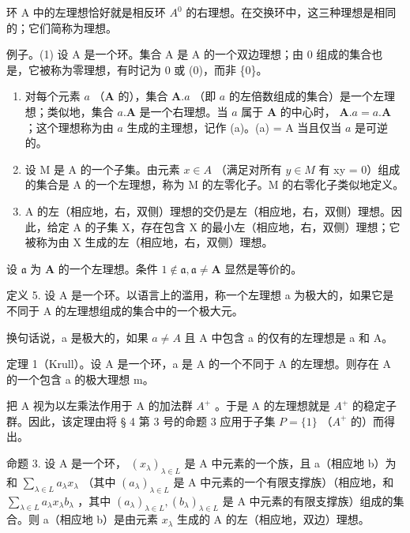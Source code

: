 环 A 中的左理想恰好就是相反环 \(A^{0}\) 的右理想。在交换环中，这三种理想是相同的；它们简称为理想。

例子。(1) 设 A 是一个环。集合 A 是 A 的一个双边理想；由 0 组成的集合也是，它被称为零理想，有时记为 0 或 (0)，而非 \{0\}。

\begin{enumerate}
\def\labelenumi{(\arabic{enumi})}
\setcounter{enumi}{1}
\item
  对每个元素 \(a\) （\(\mathbf{A}\) 的），集合 \(\mathbf{A}.a\) （即 \(a\) 的左倍数组成的集合）是一个左理想；类似地，集合 \(a.\mathbf{A}\) 是一个右理想。当 \(a\) 属于 \(\mathbf{A}\) 的中心时， \(\mathbf{A}.a = a.\mathbf{A}\) ；这个理想称为由 \(a\) 生成的主理想，记作 (a)。(a) = A 当且仅当 \(a\) 是可逆的。
\item
  设 M 是 A 的一个子集。由元素 \(x \in A\) （满足对所有 \(y \in M\) 有 xy = 0）组成的集合是 A 的一个左理想，称为 M 的左零化子。M 的右零化子类似地定义。
\item
  A 的左（相应地，右，双侧）理想的交仍是左（相应地，右，双侧）理想。因此，给定 A 的子集 X，存在包含 X 的最小左（相应地，右，双侧）理想；它被称为由 X 生成的左（相应地，右，双侧）理想。
\end{enumerate}

设 \(\mathfrak{a}\) 为 \(\mathbf{A}\) 的一个左理想。条件 \(1 \notin \mathfrak{a}, \mathfrak{a} \neq \mathbf{A}\) 显然是等价的。

定义 5. 设 A 是一个环。以语言上的滥用，称一个左理想 a 为极大的，如果它是不同于 A 的左理想组成的集合中的一个极大元。

换句话说，a 是极大的，如果 \(a \neq A\) 且 A 中包含 a 的仅有的左理想是 a 和 A。

定理 1（Krull）。设 A 是一个环，a 是 A 的一个不同于 A 的左理想。则存在 A 的一个包含 a 的极大理想 m。

把 A 视为以左乘法作用于 A 的加法群 \(A^{+}\) 。于是 A 的左理想就是 \(A^{+}\) 的稳定子群。因此，该定理由将 § 4 第 3 号的命题 3 应用于子集 \(P = \{1\}\) （\(A^{+}\) 的）而得出。

命题 3. 设 A 是一个环， \((x_{\lambda})_{\lambda \in L}\) 是 A 中元素的一个族，且 a（相应地 b）为和 \(\sum_{\lambda \in L} a_{\lambda} x_{\lambda}\) （其中 \((a_{\lambda})_{\lambda \in L}\) 是 A 中元素的一个有限支撑族）（相应地，和 \(\sum_{\lambda \in L} a_{\lambda} x_{\lambda} b_{\lambda}\) ，其中 \((a_{\lambda})_{\lambda \in L}, (b_{\lambda})_{\lambda \in L}\) 是 A 中元素的有限支撑族）组成的集合。则 a（相应地 b）是由元素 \(x_{\lambda}\) 生成的 A 的左（相应地，双边）理想。

